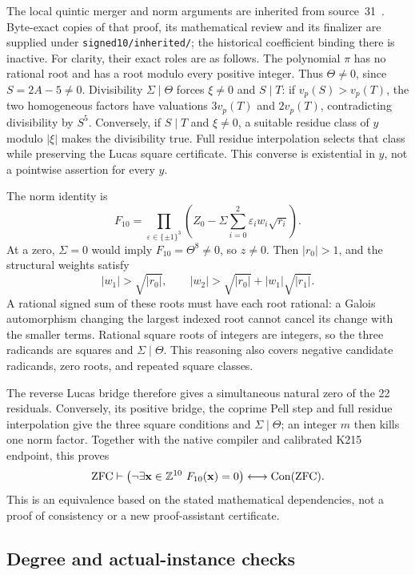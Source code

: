 The local quintic merger and norm arguments are inherited from
source~31~\cite{repo}. Byte-exact copies of that proof, its mathematical
review and its finalizer are supplied under \texttt{signed10/inherited/};
the historical coefficient binding there is inactive. For clarity, their exact roles are as follows.
The polynomial $\pi$ has no rational root and has a root modulo every
positive integer. Thus $\Theta\ne0$, since $S=2A-5\ne0$.
Divisibility $\Sigma\mid\Theta$ forces $\xi\ne0$ and $S\mid T$:
if $v_p(S)>v_p(T)$, the two homogeneous factors have valuations
$3v_p(T)$ and $2v_p(T)$, contradicting divisibility by $S^5$.
Conversely, if $S\mid T$ and $\xi\ne0$, a suitable residue class of $y$
modulo $|\xi|$ makes the divisibility true. Full residue interpolation
selects that class while preserving the Lucas square certificate.
This converse is existential in $y$, not a pointwise assertion for every $y$.

The norm identity is
\[
 F_{10}=\prod_{\varepsilon\in\{\pm1\}^3}
 \left(Z_0-\Sigma\sum_{i=0}^2\varepsilon_iw_i\sqrt{r_i}\right).
\]
At a zero, $\Sigma=0$ would imply $F_{10}=\Theta^8\ne0$, so
$z\ne0$. Then $|r_0|>1$, and the structural weights satisfy
\[
 |w_1|>\sqrt{|r_0|},\qquad
 |w_2|>\sqrt{|r_0|}+|w_1|\sqrt{|r_1|}.
\]
A rational signed sum of these roots must have each root rational:
a Galois automorphism changing the largest indexed root cannot cancel
its change with the smaller terms. Rational square roots of integers
are integers, so the three radicands are squares and $\Sigma\mid\Theta$.
This reasoning also covers negative candidate radicands, zero roots,
and repeated square classes.

The reverse Lucas bridge therefore gives a simultaneous natural zero
of the 22 residuals. Conversely, its positive bridge, the coprime Pell
step and full residue interpolation give the three square conditions
and $\Sigma\mid\Theta$; an integer $m$ then kills one norm factor.
Together with the native compiler and calibrated K215 endpoint, this
proves
\[
 \mathrm{ZFC}\vdash
 \bigl(\neg\exists\mathbf x\in\mathbb Z^{10}\ F_{10}(\mathbf x)=0\bigr)
 \longleftrightarrow\operatorname{Con}(\mathrm{ZFC}).
\]
This is an equivalence based on the stated mathematical dependencies,
not a proof of consistency or a new proof-assistant certificate.

\subsection{Degree and actual-instance checks}

